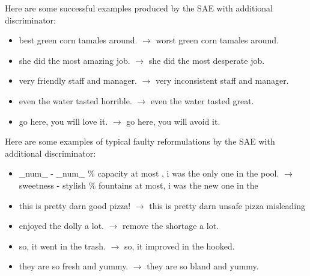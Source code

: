 \documentclass[11pt,a4paper]{article}
\begin{document}
Here are some successful examples produced by the SAE with additional discriminator:
\begin{itemize}
\item best green corn tamales around. $\rightarrow$ worst green corn tamales around.
\item she did the most amazing job. $\rightarrow$ she did the most desperate job.
\item very friendly staff and manager. $\rightarrow$ very inconsistent staff and manager.
\item even the water tasted horrible. $\rightarrow$ even the water tasted great.
\item go here, you will love it. $\rightarrow$ go here, you will avoid it.
\end{itemize}


Here are some examples of typical faulty reformulations by the SAE with additional discriminator:
\begin{itemize}
\item \_num\_ - \_num\_ \% capacity at most , i was the only one in the pool. $\rightarrow$ sweetness - stylish \% fountains at most, i was the new one in the
\item this is pretty darn good pizza! $\rightarrow$ this is pretty darn unsafe pizza misleading
\item enjoyed the dolly a lot. $\rightarrow$ remove the shortage a lot.
\item so, it went in the trash. $\rightarrow$ so, it improved in the hooked.
\item they are so fresh and yummy. $\rightarrow$ they are so bland and yummy.
\end{itemize}
\end{document}
